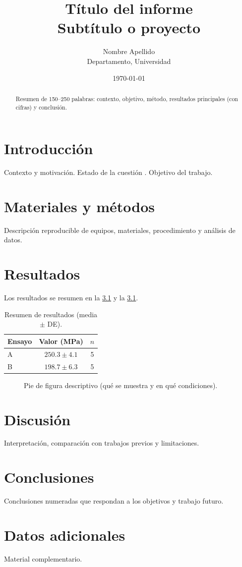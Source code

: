 \documentclass[11pt,a4paper]{report}
\title{Título del informe\\[0.5em]\large Subtítulo o proyecto}
\author{Nombre Apellido\\ Departamento, Universidad}
\date{\today}
\begin{document}
\maketitle
\thispagestyle{empty}

\begin{abstract}
Resumen de 150--250 palabras: contexto, objetivo, método, resultados principales (con cifras) y conclusión.
\end{abstract}

\tableofcontents

\chapter{Introducción}
\label{cap:intro}
Contexto y motivación. Estado de la cuestión \parencite{ejemplo2023}. Objetivo del trabajo.

\chapter{Materiales y métodos}
\label{cap:metodos}
Descripción reproducible de equipos, materiales, procedimiento y análisis de datos.

\chapter{Resultados}
\label{cap:resultados}
Los resultados se resumen en la \cref{tab:resumen} y la \cref{fig:ejemplo}.

\begin{table}[htbp]
  \centering
  \caption{Resumen de resultados (media $\pm$ DE).}
  \label{tab:resumen}
  \begin{tabular}{lcc}
    \toprule
    Ensayo & Valor (\si{\mega\pascal}) & $n$ \\
    \midrule
    A & $\num{250.3} \pm \num{4.1}$ & 5 \\
    B & $\num{198.7} \pm \num{6.3}$ & 5 \\
    \bottomrule
  \end{tabular}
\end{table}

\begin{figure}[htbp]
  \centering
  \fbox{\rule{0pt}{4cm}\rule{0.6\linewidth}{0pt}}
  \caption{Pie de figura descriptivo (qué se muestra y en qué condiciones).}
  \label{fig:ejemplo}
\end{figure}

\chapter{Discusión}
Interpretación, comparación con trabajos previos y limitaciones.

\chapter{Conclusiones}
Conclusiones numeradas que respondan a los objetivos y trabajo futuro.

\printbibliography[heading=bibintoc,title={Referencias}]

\appendix
\chapter{Datos adicionales}
Material complementario.
\end{document}
